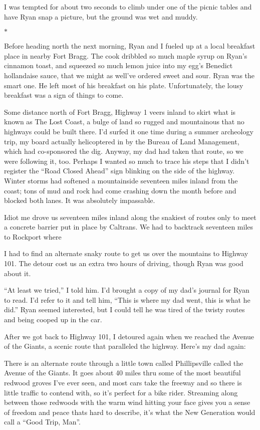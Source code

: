 \documentclass[12pt]{book}
\begin{document}
I was tempted for about two seconds to climb under one of the picnic tables and have Ryan snap a picture, but the ground was wet and muddy.

\begin{center}$*$\end{center}

Before heading north the next morning, Ryan and I fueled up at a local breakfast place in nearby Fort Bragg. The cook dribbled so much maple syrup on Ryan's cinnamon toast, and squeezed so much lemon juice into my egg's Benedict hollandaise sauce, that we might as well've ordered sweet and sour. Ryan was the smart one. He left most of his breakfast on his plate. Unfortunately, the lousy breakfast was a sign of things to come.

Some distance north of Fort Bragg, Highway 1 veers inland to skirt what is known as The Lost Coast, a bulge of land so rugged and mountainous that no highways could be built there. I'd surfed it one time during a summer archeology trip, my board actually helicoptered in by the Bureau of Land Management, which had co-sponsored the dig. Anyway, my dad had taken that route, so we were following it, too. Perhaps I wanted so much to trace his steps that I didn't register the ``Road Closed Ahead'' sign blinking on the side of the highway. Winter storms had softened a mountainside seventeen miles inland from the coast; tons of mud and rock had come crashing down the month before and blocked both lanes. It was absolutely impassable.

Idiot me drove us seventeen miles inland along the snakiest of routes only to meet a concrete barrier put in place by Caltrans. We had to backtrack seventeen miles to Rockport where

I had to find an alternate snaky route to get us over the mountains to Highway 101. The detour cost us an extra two hours of driving, though Ryan was good about it.

``At least we tried,'' I told him. I'd brought a copy of my dad's journal for Ryan to read. I'd refer to it and tell him, ``This is where my dad went, this is what he did.'' Ryan seemed interested, but I could tell he was tired of the twisty routes and being cooped up in the car.

After we got back to Highway 101, I detoured again when we reached the Avenue of the Giants, a scenic route that paralleled the highway. Here's my dad again:

There is an alternate route through a little town called Phillipsville called the Avenue of the Giants. It goes about 40 miles thru some of the most beautiful redwood groves I've ever seen, and most cars take the freeway and so there is little traffic to contend with, so it's perfect for a bike rider. Streaming along between those redwoods with the warm wind hitting your face gives you a sense of freedom and peace thats hard to describe, it's what the New Generation would call a ``Good Trip, Man''.
\end{document}
